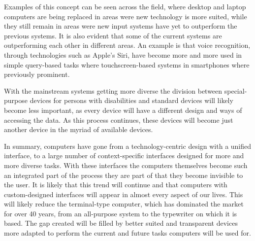 Examples of this concept can be seen across the field, where desktop and laptop computers are being replaced in areas were new technology is more suited, while they still remain in areas were new input systems have yet to outperform the previous systems. It is also evident that some of the current systems are outperforming each other in different areas. An example is that voice recognition, through technologies such as Apple's Siri, have become more and more used in simple query-based tasks where touchscreen-based systems in smartphones where previously prominent.

With the mainstream systems getting more diverse the division between special-purpose devices for persons with disabilities and standard devices will likely become less important, as every device will have a different design and ways of accessing the data. As this process continues, these devices will become just another device in the myriad of available devices.

In summary, computers have gone from a technology-centric design with a unified interface, to a large number of context-specific interfaces designed for more and more diverse tasks. With these interfaces the computers themselves become such an integrated part of the process they are part of that they become invisible to the user. It is likely that this trend will continue and that computers with custom-designed interfaces will appear in almost every aspect of our lives. This will likely reduce the terminal-type computer, which has dominated the market for over 40 years, from an all-purpose system to the typewriter on which it is based. The gap created will be filled by better suited and transparent devices more adapted to perform the current and future tasks computers will be used for.